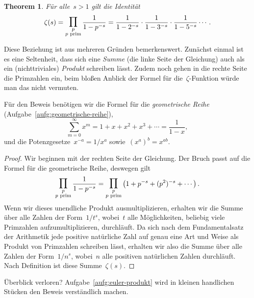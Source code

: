\documentclass[twoside]{../zirkelblatt1415}
\theoremstyle{definition}
\theoremstyle{plain}
\newtheorem{thm}[defn]{Theorem}
\theoremstyle{remark}
\newcommand{\prim}[1]{\text{\textnormal{$#1$ prim}}}
\newcommand{\bigprod}{\mathop{\mathlarger{\mathlarger{\prod}}}}
\begin{document}
\begin{thm}Für alle~$s > 1$ gilt die Identität
\[ \zeta(s) = \bigprod_{\substack{p\\\prim{p}}} \frac{1}{1 - p^{-s}} =
  \frac{1}{1 - 2^{-s}} \cdot \frac{1}{1 - 3^{-s}} \cdot \frac{1}{1 - 5^{-s}} \cdots. \]
\end{thm}
Diese Beziehung ist aus mehreren Gründen bemerkenswert. Zunächst einmal ist es
eine Seltenheit, dass sich eine \emph{Summe} (die linke Seite der Gleichung)
auch als ein (nichttriviales) \emph{Produkt} schreiben lässt. Zudem noch gehen
in die rechte Seite die Primzahlen ein, beim bloßen Anblick der Formel für
die~$\zeta$-Funktion würde man das nicht vermuten.

Für den Beweis benötigen wir die Formel für die \emph{geometrische Reihe}
(Aufgabe~\ref{aufg:geometrische-reihe}),
\[ \sum_{m = 0}^\infty x^m = 1 + x + x^2 + x^3 + \cdots = \frac{1}{1 - x}, \]
und die Potenzgesetze~$x^{-a} = 1/x^a$ sowie~$(x^a)^b = x^{ab}$.

\begin{proof}Wir beginnen mit der rechten Seite der Gleichung. Der Bruch passt
auf die Formel für die geometrische Reihe, deswegen gilt
\[
  \bigprod_{\substack{p\\\prim{p}}} \frac{1}{1 - p^{-s}} =
  \bigprod_{\substack{p\\\prim{p}}} \left(1 + p^{-s} + (p^2)^{-s} + \cdots\right).
\]
Wenn wir dieses unendliche Produkt ausmultiplizieren, erhalten wir
die Summe über alle Zahlen der Form~$1/t^s$, wobei~$t$ alle Möglichkeiten,
beliebig viele Primzahlen aufzumultiplizieren, durchläuft. Da sich nach dem
Fundamentalsatz der Arithmetik jede positive natürliche Zahl auf genau eine Art
und Weise als Produkt von Primzahlen schreiben lässt, erhalten wir also die
Summe über alle Zahlen der Form~$1/n^s$, wobei~$n$ alle positiven natürlichen
Zahlen durchläuft. Nach Definition ist diese Summe~$\zeta(s)$.
\end{proof}

Überblick verloren? Aufgabe~\ref{aufg:euler-produkt} wird in kleinen handlichen
Stücken den Beweis verständlich machen.
\end{document}
